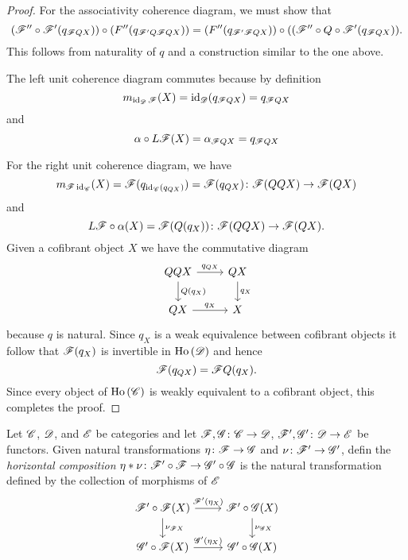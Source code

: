 \documentclass[10pt]{amsart}
\begin{document}
\begin{thm}
\begin{proof}
    For the associativity coherence diagram, we must show that
    $$(\mathscr{F}^{\prime\prime} \circ \mathscr{F}^\prime(q_{\mathscr{F} QX})) \circ (F^{\prime\prime}(q_{\mathscr{F}^\prime Q\mathscr{F} QX})) = (F^{\prime\prime}(q_{\mathscr{F}^\prime\mathscr{F} QX})) \circ ((\mathscr{F}^{\prime\prime}\circ Q \circ \mathscr{F}^\prime(q_{\mathscr{F} Q X})).$$
    This follows from naturality of $q$ and a construction similar to the one above.
    
    The left unit coherence diagram commutes because by definition
    $$m_{\operatorname{id}_{\mathscr{D}}\mathscr{F}}(X) = \operatorname{id}_{\mathscr{D}}(q_{\mathscr{F} Q X}) = q_{\mathscr{F} Q X}$$
    and
    $$\alpha \circ L\mathscr{F}(X) = \alpha_{\mathscr{F} QX} = q_{\mathscr{F} Q X}$$

    For the right unit coherence diagram, we have
    $$m_{\mathscr{F}\operatorname{id}_{\mathscr{C}}}(X) = \mathscr{F}(q_{\operatorname{id}_{\mathscr{C}}(q_{QX})}) = \mathscr{F}(q_{QX}) \colon \mathscr{F}(QQX) \to \mathscr{F}(QX)$$
    and 
    $$L\mathscr{F} \circ \alpha(X) = \mathscr{F}(Q(q_{X})) \colon \mathscr{F}(QQX) \to \mathscr{F}(QX).$$
    Given a cofibrant object $X$ we have the commutative diagram
    $$\begin{tikzcd}
      QQX \arrow{r}{q_{QX}}\arrow{d}{Q(q_X)} & QX\arrow{d}{q_X}\\
      QX \arrow{r}{q_X} & X
    \end{tikzcd}$$
    because $q$ is natural.
    Since $q_X$ is a weak equivalence between cofibrant objects it follow that $\mathscr{F}(q_X)$ is invertible in $\operatorname{Ho}\left(\mathscr{D}\right)$ and hence
    $$\mathscr{F}(q_{QX}) = \mathscr{F} Q(q_X).$$
    Since every object of $\operatorname{Ho}\left(\mathscr{C}\right)$ is weakly equivalent to a cofibrant object, this completes the proof.
  \end{proof}
\end{thm}

\begin{defn}
  Let $\mathscr{C}$, $\mathscr{D}$, and $\mathscr{E}$ be categories and let $\mathscr{F}, \mathscr{G} \colon \mathscr{C} \to \mathscr{D}$, $\mathscr{F}^\prime, \mathscr{G}^\prime \colon \mathscr{D} \to \mathscr{E}$ be functors.
  Given natural transformations $\eta \colon \mathscr{F} \to \mathscr{G}$ and $\nu \colon \mathscr{F}^\prime \to \mathscr{G}^\prime$, defin the {\it horizontal composition} $\eta \ast \nu \colon \mathscr{F}^\prime \circ \mathscr{F} \to \mathscr{G}^\prime \circ \mathscr{G}$ is the natural transformation defined by the collection of morphisms of $\mathscr{E}$
  $$\begin{tikzcd}
    \F^\prime \circ \F(X) \arrow{r}{\F^\prime(\eta_X)}\arrow{d}{\nu_{\F X}} & \F^\prime \circ \G(X)\arrow{d}{\nu_{\G X}}\\
    \G^\prime \circ \F(X) \arrow{r}{\G^\prime(\eta_X)}& \G^\prime \circ \G(X)
  \end{tikzcd}$$
\end{defn}
\end{document}
